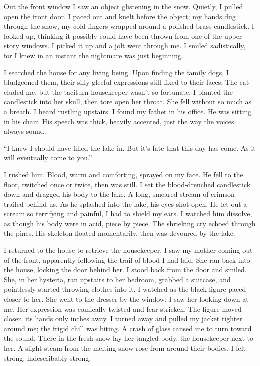 Out the front window I saw an object glistening in the snow. Quietly, I
pulled open the front door. I paced out and knelt before the object; my
hands dug through the snow, my cold fingers wrapped around a polished
brass candlestick. I looked up, thinking it possibly could have been
thrown from one of the upper-story windows. I picked it up and a jolt
went through me. I smiled sadistically, for I knew in an instant the
nightmare was just beginning.

I searched the house for any living being. Upon finding the family dogs,
I bludgeoned them, their silly gleeful expressions still fixed to their
faces. The cat eluded me, but the taciturn housekeeper wasn't so
fortunate. I planted the candlestick into her skull, then tore open her
throat. She fell without so much as a breath. I heard rustling upstairs.
I found my father in his office. He was sitting in his chair. His speech
was thick, heavily accented, just the way the voices always sound.

``I knew I should have filled the lake in. But it's fate that this day
has come. As it will eventually come to you.''

I rushed him. Blood, warm and comforting, sprayed on my face. He fell to
the floor, twitched once or twice, then was still. I set the
blood-drenched candlestick down and dragged his body to the lake. A
long, smeared stream of crimson trailed behind us. As he splashed into
the lake, his eyes shot open. He let out a scream so terrifying and
painful, I had to shield my ears. I watched him dissolve, as though his
body were in acid, piece by piece. The shrieking cry echoed through the
pines. His skeleton floated momentarily, then was devoured by the lake.

I returned to the house to retrieve the housekeeper. I saw my mother
coming out of the front, apparently following the trail of blood I had
laid. She ran back into the house, locking the door behind her. I stood
back from the door and smiled. She, in her hysteria, ran upstairs to her
bedroom, grabbed a suitcase, and pointlessly started throwing clothes
into it. I watched as the black figure paced closer to her. She went to
the dresser by the window; I saw her looking down at me. Her expression
was comically twisted and fear-stricken. The figure moved closer, its
hands only inches away. I turned away and pulled my jacket tighter
around me; the frigid chill was biting. A crash of glass caused me to
turn toward the sound. There in the fresh snow lay her tangled body, the
housekeeper next to her. A slight steam from the melting snow rose from
around their bodies. I felt strong, indescribably strong.

